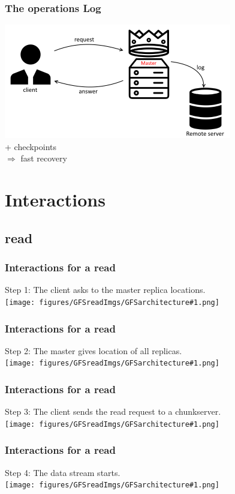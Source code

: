 \documentclass{beamer}
\begin{document}
\begin{frame}
 \frametitle{The operations Log}
 \begin{center}
 \includegraphics[height=5cm]{figures/logschema.png}
 \\\alert{+ checkpoints}\\
 $\Rightarrow$ fast recovery
 \end{center}
\end{frame}

\section{Interactions}
\subsection{read}
\newcommand{\readslide}[2]{\begin{frame}\frametitle{Interactions for a read}\alert{Step #1}: #2\vspace{1cm}\\\centering\texttt{[image: figures/GFSreadImgs/GFSarchitecture\#1.png]}\end{frame}}
\readslide{1}{The client asks to the master replica locations.}
\readslide{2}{The master gives location of all replicas.}
\readslide{3}{The client sends the read request to a chunkserver.}
\readslide{4}{The data stream starts.}
\end{document}
